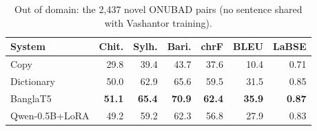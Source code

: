 \begin{table}[t]\centering\footnotesize
\begin{tabular}{@{}lrrrrrr@{}}\toprule
System & Chit. & Sylh. & Bari. & chrF & BLEU & LaBSE\\\midrule
Copy & 29.8 & 39.4 & 43.7 & 37.6 & 10.4 & 0.71\\
\addlinespace[1pt]
Dictionary & 50.0 & 62.9 & 65.6 & 59.5 & 31.5 & 0.85\\
BanglaT5 & \textbf{51.1} & \textbf{65.4} & \textbf{70.9} & \textbf{62.4} & \textbf{35.9} & \textbf{0.87}\\
Qwen-0.5B+LoRA & 49.2 & 59.2 & 62.3 & 56.8 & 27.9 & 0.83\\
\bottomrule\end{tabular}
\caption{Out of domain: the 2,437 novel ONUBAD pairs (no sentence shared with Vashantor training).}\label{tab:onubad}
\end{table}
